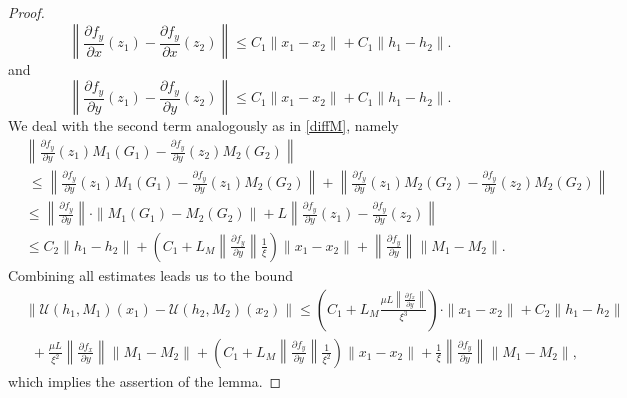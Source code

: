 \documentclass[11pt, leqno]{amsart}
\theoremstyle{definition}
\begin{document}
\begin{proof}
$$  \left\|\frac{\partial f_y}{\partial x}(z_1) - \frac{\partial f_y}{\partial x}(z_2) \right\| \leq C_1 \|x_1-x_2\|+C_1\|h_1-h_2\|.
  $$
  and
  $$  \left\|\frac{\partial f_y}{\partial y}(z_1) - \frac{\partial f_y}{\partial y}(z_2) \right\| \leq C_1 \|x_1-x_2\|+C_1\|h_1-h_2\|.
  $$
  We deal with the second term analogously as in \eqref{diffM}, namely
  \begin{align*}
  	& \left\|
  	\frac{\partial f_y}{\partial y}(z_1)M_1(G_1) - \frac{\partial f_y}{\partial y}(z_2)M_2(G_2) \right\|  \\
  	&\ \leq  \left\|
  	\frac{\partial f_y}{\partial y}(z_1)M_1(G_1) - \frac{\partial f_y}{\partial y}(z_1)M_2(G_2) \right\| 
  	+  \left\|
  	\frac{\partial f_y}{\partial y}(z_1)M_2(G_2) - \frac{\partial f_y}{\partial y}(z_2)M_2(G_2) \right\|\nonumber\\
  	&  \leq \left\|\frac{\partial f_y}{\partial y}\right\| \cdot \|M_1(G_1) - M_2(G_2)\| + L \left\| \frac{\partial f_y}{\partial y}(z_1) - \frac{\partial f_y}{\partial y}(z_2) \right\| \nonumber \\
  	& \leq C_2\|h_1-h_2\| + \left(C_1+L_M\left\|\frac{\partial f_y}{\partial y}\right\| \frac{1}{\xi}\right)\|x_1-x_2\|+ \left\|\frac{\partial f_y}{\partial y}\right\| \|M_1-M_2\|.\nonumber
  \end{align*} 
Combining all estimates leads us to the bound 
\begin{align*}
& \|\mathcal{U}(h_1,M_1)(x_1)- \mathcal{U}(h_2,M_2)(x_2)\| \leq \left( C_1 +  L_M  \frac{\mu L \left\|\frac{\partial f_x}{\partial y}\right\|}{\xi^3}  \right)\cdot \|x_1-x_2\| + C_2\|h_1-h_2\| \\
& \ \   +  \frac{\mu L}{\xi^2}\left\|\frac{\partial f_x}{\partial y}\right\|\|M_1-M_2\|+ \left(C_1+L_M\left\|\frac{\partial f_y}{\partial y}\right\| \frac{1}{\xi^2}\right)\|x_1-x_2\|+ \frac{1}{\xi}\left\|\frac{\partial f_y}{\partial y}\right\| \|M_1-M_2\|,
\end{align*}
which implies the assertion of the lemma.
\end{proof}
\end{document}
